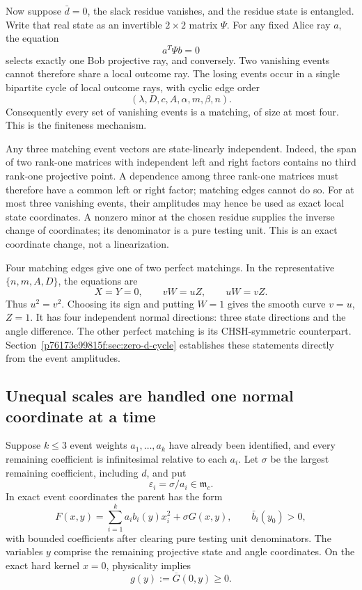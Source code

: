 Now suppose $\bar d=0$, the slack residue vanishes, and the residue state is
entangled.  Write that real state as an invertible $2\times2$ matrix $\Psi$.
For any fixed Alice ray $a$, the equation
\[
                         a^T\Psi b=0
\]
selects exactly one Bob projective ray, and conversely.  Two vanishing events
cannot therefore share a local outcome ray.  The losing events occur in a single bipartite cycle of local outcome rays,
with cyclic edge order
\[
                    (\lambda,D,c,A,\alpha,m,\beta,n).
\]
Consequently every set of vanishing events is a matching, of size at most
four.  This is the finiteness mechanism.

Any three matching event vectors are state-linearly independent.  Indeed,
the span of two rank-one matrices with independent left and right factors
contains no third rank-one projective point.  A dependence among three
rank-one matrices must therefore have a common left or right factor;
matching edges cannot do so.  For at most three vanishing events, their
amplitudes may hence be used as exact local state coordinates.  A nonzero
minor at the chosen residue supplies the inverse change of coordinates;
its denominator is a pure testing unit.  This is an exact coordinate change,
not a linearization.

Four matching edges give one of two perfect matchings.  In the representative
$\{n,m,A,D\}$, the equations are
\[
 X=Y=0,\qquad vW=uZ,\qquad uW=vZ.
\]
Thus $u^2=v^2$.  Choosing its sign and putting $W=1$ gives the smooth curve
$v=u$, $Z=1$.  It has four independent normal directions: three state
directions and the angle difference.  The other perfect matching is its
CHSH-symmetric counterpart.  Section~\ref{p76173e99815f:sec:zero-d-cycle} establishes these
statements directly from the event amplitudes.

\subsection{Unequal scales are handled one normal coordinate at a time}
Suppose $k\leq3$ event weights $a_1,\ldots,a_k$ have already been identified,
and every remaining coefficient is infinitesimal relative to each $a_i$.
Let $\sigma$ be the largest remaining coefficient, including $d$, and put
\[
 \varepsilon_i=\sigma/a_i\in\mathfrak m_c.
\]
In exact event coordinates the parent has the form
\begin{equation}\label{p2c3fc22497a5:eq:pp-diagonal}
 F(x,y)=\sum_{i=1}^k a_i b_i(y)x_i^2+\sigma G(x,y),
 \qquad \bar b_i(y_0)>0,
\end{equation}
with bounded coefficients after clearing pure testing unit denominators.
The variables $y$ comprise the remaining projective state and angle
coordinates.  On the exact hard kernel $x=0$, physicality implies
\[
                         g(y):=\overline G(0,y)\geq0.
\]

